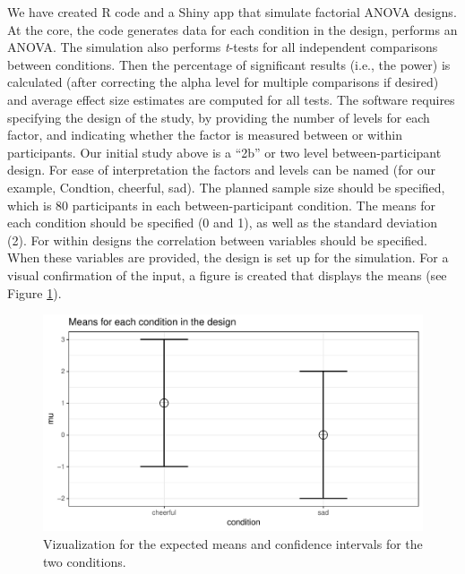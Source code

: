\documentclass[,jou, draftfirst, a4paper,floatsintext]{apa6}
\begin{document}
We have created R code and a Shiny app that simulate factorial ANOVA designs.
At the core, the code generates data for each condition in the design, performs an ANOVA.
The simulation also performs \emph{t}-tests for all independent comparisons between conditions.
Then the percentage of significant results (i.e., the power) is calculated (after correcting the alpha level for multiple comparisons if desired) and average effect size estimates are computed for all tests.
The software requires specifying the design of the study, by providing the number of levels for each factor, and indicating whether the factor is measured between or within participants. Our initial study above is a \enquote{2b} or two level between-participant design.
For ease of interpretation the factors and levels can be named (for our example, Condtion, cheerful, sad).
The planned sample size should be specified, which is 80 participants in each between-participant condition.
The means for each condition should be specified (0 and 1), as well as the standard deviation (2).
For within designs the correlation between variables should be specified.
When these variables are provided, the design is set up for the simulation.
For a visual confirmation of the input, a figure is created that displays the means (see Figure \ref{fig:mean-plot2}).

\begin{figure}
\centering
\includegraphics{0.1_Simulation_Based_Power_Analysis_For_Factorial_ANOVA_Designs_files/figure-latex/mean-plot2-1.pdf}
\caption{\label{fig:mean-plot2}Vizualization for the expected means and confidence intervals for the two conditions.}
\end{figure}
\end{document}
